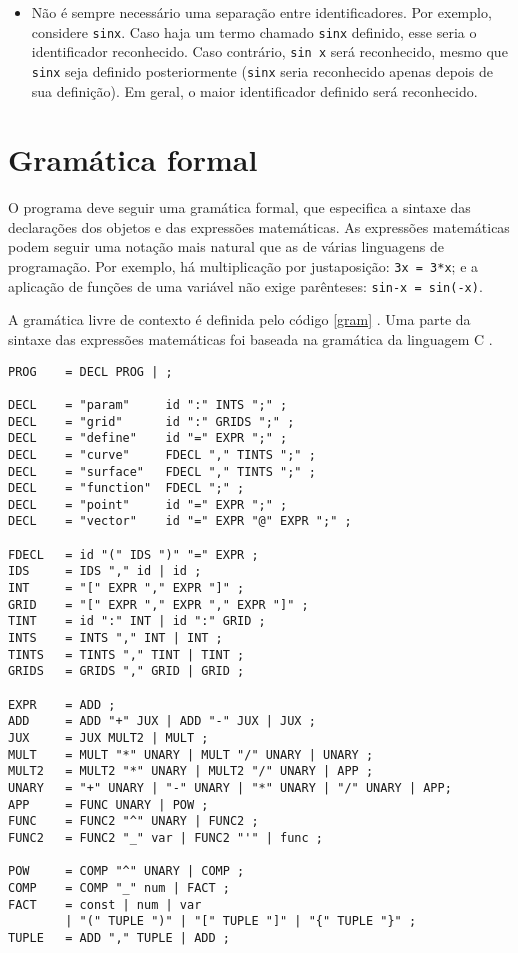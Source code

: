 \begin{itemize}
\item
Não é sempre necessário uma separação entre identificadores.
Por exemplo, considere \texttt{sinx}.
Caso haja um termo chamado \texttt{sinx} definido, esse seria o identificador reconhecido.
Caso contrário, \texttt{sin x} será reconhecido,
mesmo que \texttt{sinx} seja definido posteriormente
(\texttt{sinx} seria reconhecido apenas depois de sua definição).
Em geral, o maior identificador definido será reconhecido.
\end{itemize}

\section{Gramática formal}
O programa deve seguir uma gramática formal,
que especifica a sintaxe das declarações dos objetos e das expressões matemáticas.
As expressões matemáticas podem seguir uma notação mais natural
que as de várias linguagens de programação.
Por exemplo, há multiplicação por justaposição: \texttt{3x = 3*x};
e a aplicação de funções de uma variável não exige parênteses: \texttt{sin-x = sin(-x)}.

A gramática livre de contexto é definida pelo código \ref{gram} \cite{Dragon:1}.
Uma parte da sintaxe das expressões matemáticas foi baseada na gramática da linguagem C \cite{CGram}.

\begin{lstlisting}[caption=Gramática livre de contexto,label=gram]
PROG    = DECL PROG | ;

DECL    = "param"     id ":" INTS ";" ;
DECL    = "grid"      id ":" GRIDS ";" ;
DECL    = "define"    id "=" EXPR ";" ;
DECL    = "curve"     FDECL "," TINTS ";" ;
DECL    = "surface"   FDECL "," TINTS ";" ;
DECL    = "function"  FDECL ";" ;
DECL    = "point"     id "=" EXPR ";" ;
DECL    = "vector"    id "=" EXPR "@" EXPR ";" ;

FDECL   = id "(" IDS ")" "=" EXPR ;
IDS     = IDS "," id | id ;
INT     = "[" EXPR "," EXPR "]" ;
GRID    = "[" EXPR "," EXPR "," EXPR "]" ;
TINT    = id ":" INT | id ":" GRID ;
INTS    = INTS "," INT | INT ;
TINTS   = TINTS "," TINT | TINT ;
GRIDS   = GRIDS "," GRID | GRID ;

EXPR    = ADD ;
ADD     = ADD "+" JUX | ADD "-" JUX | JUX ;
JUX     = JUX MULT2 | MULT ;
MULT    = MULT "*" UNARY | MULT "/" UNARY | UNARY ;
MULT2   = MULT2 "*" UNARY | MULT2 "/" UNARY | APP ;
UNARY   = "+" UNARY | "-" UNARY | "*" UNARY | "/" UNARY | APP;
APP     = FUNC UNARY | POW ;
FUNC    = FUNC2 "^" UNARY | FUNC2 ;
FUNC2   = FUNC2 "_" var | FUNC2 "'" | func ;

POW     = COMP "^" UNARY | COMP ;
COMP    = COMP "_" num | FACT ;
FACT    = const | num | var
        | "(" TUPLE ")" | "[" TUPLE "]" | "{" TUPLE "}" ;
TUPLE   = ADD "," TUPLE | ADD ;

\end{lstlisting}

